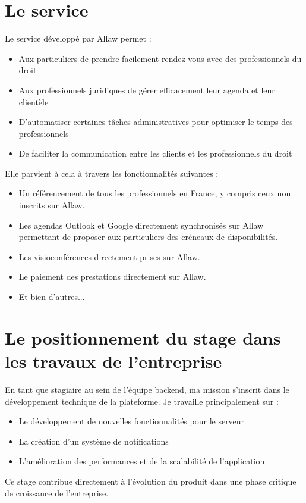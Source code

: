 \section{Le service}
Le service développé par Allaw permet :
\begin{itemize}
    \item Aux particuliers de prendre facilement rendez-vous avec des professionnels du droit
    \item Aux professionnels juridiques de gérer efficacement leur agenda et leur clientèle
    \item D'automatiser certaines tâches administratives pour optimiser le temps des professionnels
    \item De faciliter la communication entre les clients et les professionnels du droit
\end{itemize}

Elle parvient à cela à travers les fonctionnalités suivantes :

\begin{itemize}
    \item Un référencement de tous les professionnels en France, y compris ceux non inscrits sur Allaw.
    \item Les agendas Outlook et Google directement synchronisés sur Allaw permettant de proposer aux particuliers des créneaux de disponibilités.
    \item Les visioconférences directement prises sur Allaw.
    \item Le paiement des prestations directement sur Allaw.
    \item Et bien d'autres...
\end{itemize}

\section{Le positionnement du stage dans les travaux de l'entreprise} 
En tant que stagiaire au sein de l'équipe backend, ma mission s'inscrit dans le développement technique de la plateforme. Je travaille principalement sur :
\begin{itemize}
    \item Le développement de nouvelles fonctionnalités pour le serveur
    \item La création d'un système de notifications
    \item L'amélioration des performances et de la scalabilité de l'application
\end{itemize}
Ce stage contribue directement à l'évolution du produit dans une phase critique
de croissance de l'entreprise.


